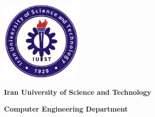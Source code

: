 \documentclass[11pt]{book}
\begin{document}
\newpage
\newcommand{\beginsupplement}{%
    \setcounter{chapter}{0}
    \renewcommand{\thechapter}{\Alph{chapter}}%
 }

\beginsupplement

\newpage

\vspace*{3cm}
{
\centering
\includegraphics[width=4cm]{iust.jpeg}
\\
\bigbreak
\centerline {\textbf{Iran University of Science and Technology}}
\bigbreak
\large\centerline {\textbf{Computer Engineering Department}}
}
\end{document}

